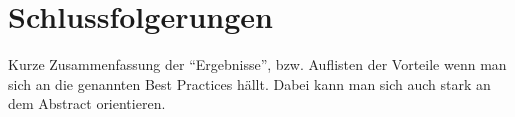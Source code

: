 \section{Schlussfolgerungen}

Kurze Zusammenfassung der \enquote{Ergebnisse}, bzw. Auflisten der Vorteile wenn man
sich an die genannten Best Practices hällt. Dabei kann man sich auch stark an
dem Abstract orientieren.